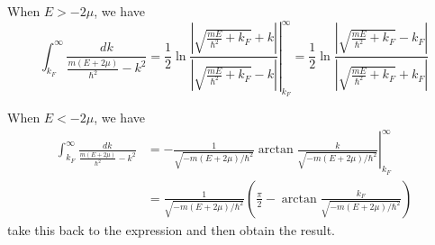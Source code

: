 When $E > -2\mu$, we have
\begin{equation}
    \int_{k_F}^{\infty} \frac{dk}{\frac{m(E+2\mu)}{\hbar^2} - k^2}
    = \frac{1}{2} \left. \ln \frac{|\sqrt{\frac{mE}{\hbar^2}+k_F}+k| }{|\sqrt{\frac{mE}{\hbar^2}+k_F}-k| }\right \vert ^{\infty}_{k_F}
    = \frac{1}{2} \ln \frac{|\sqrt{\frac{mE}{\hbar^2}+k_F} - k_F| }{|\sqrt{\frac{mE}{\hbar^2}+k_F} + k_F| }
\end{equation}

When $E < -2\mu$, we have
\begin{equation}
    \begin{aligned}
        \int_{k_F}^{\infty} \frac{dk}{\frac{m(E+2\mu)}{\hbar^2} - k^2}
        & = - \left.
        \frac{1}{\sqrt{-m(E+2\mu)/\hbar^2}}    
        \arctan \frac{k}{\sqrt{-m(E+2\mu)/\hbar^2}}
        \right \vert^{\infty}_{k_F}\\
        & = \frac{1}{\sqrt{-m(E+2\mu)/\hbar^2}}
        (\frac{\pi}{2} - \arctan \frac{k_F}{\sqrt{-m(E+2\mu)/\hbar^2}})
    \end{aligned}
\end{equation}
take this back to the expression and then obtain the result.
